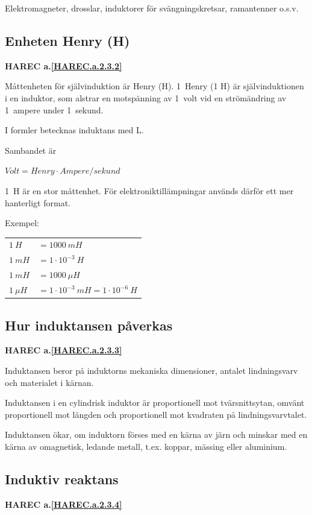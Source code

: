 Elektromagneter, drosslar, induktorer för svängningskretsar, ramantenner o.s.v.

\subsection{Enheten Henry (H)}
\textbf{HAREC a.\ref{HAREC.a.2.3.2}\label{myHAREC.a.2.3.2}}

Måttenheten för självinduktion är Henry (H). 1~Henry (1 H) är självinduktionen i
en induktor, som alstrar en motspänning av 1~volt vid en strömändring av
1~ampere under 1~sekund.

I formler betecknas induktans med L.

Sambandet är

\(Volt = Henry \cdot Ampere/sekund\)

1~H är en stor måttenhet. För elektroniktillämpningar används därför ett mer
hanterligt format.

Exempel:

\begin{tabular}{ll}
\(1\ H \) & \(= 1000\ mH\) \\
\(1\ mH\) & \(= 1 \cdot 10^{-3}\ H\) \\
\(1\ mH\) & \(= 1000\ \mu H\) \\
\(1\ \mu H\) & \(= 1 \cdot 10^{-3}\ mH = 1 \cdot 10^{-6}\ H \)
\end{tabular}

\subsection{Hur induktansen påverkas}
\textbf{HAREC a.\ref{HAREC.a.2.3.3}\label{myHAREC.a.2.3.3}}

Induktansen beror på induktorns mekaniska dimensioner, antalet lindningsvarv och
materialet i kärnan.

Induktansen i en cylindrisk induktor är proportionell mot tvärsnittsytan, omvänt
proportionell mot längden och proportionell mot kvadraten på lindningsvarvtalet.

Induktansen ökar, om induktorn förses med en kärna av järn och minskar med en
kärna av omagnetisk, ledande metall, t.ex. koppar, mässing eller aluminium.

\subsection{Induktiv reaktans}
\textbf{HAREC a.\ref{HAREC.a.2.3.4}\label{myHAREC.a.2.3.4}}

